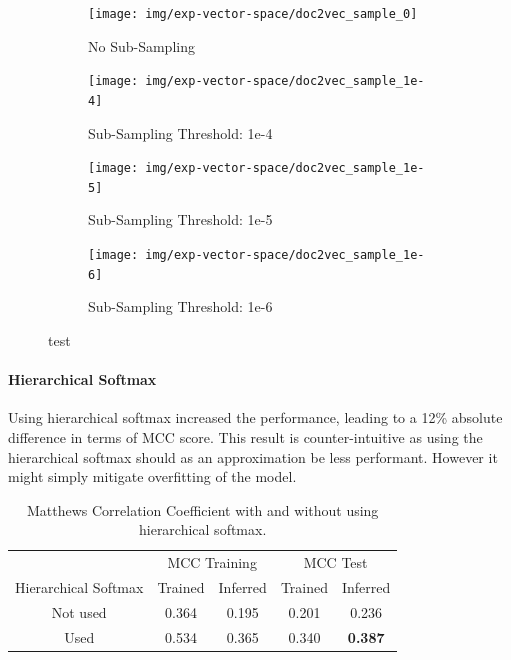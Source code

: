 \begin{figure}[h!]
    \centering
    \begin{subfigure}[b]{0.49\textwidth}
      \texttt{[image: img/exp-vector-space/doc2vec\_sample\_0]}
      \caption{No Sub-Sampling}
\label{fig:doc2vec_sample_0}
    \end{subfigure}
    \begin{subfigure}[b]{0.49\textwidth}
      \texttt{[image: img/exp-vector-space/doc2vec\_sample\_1e-4]}
    \caption{Sub-Sampling Threshold: 1e-4}
\label{fig:doc2vec_vector_size_1e-4}
    \end{subfigure}
    \begin{subfigure}[b]{0.49\textwidth}
      \texttt{[image: img/exp-vector-space/doc2vec\_sample\_1e-5]}
      \caption{Sub-Sampling Threshold: 1e-5}
\label{fig:doc2vec_vector_size_1e-5}
  \end{subfigure}
  \begin{subfigure}[b]{0.49\textwidth}
    \texttt{[image: img/exp-vector-space/doc2vec\_sample\_1e-6]}
    \caption{Sub-Sampling Threshold: 1e-6}
\label{fig:doc2vec_sample_1e-6}
  \end{subfigure}
\caption{test}
\label{fig:doc2vec_sample}
\end{figure}

\paragraph{Hierarchical Softmax}
Using hierarchical softmax increased the performance, leading to a 12\% absolute difference in terms of MCC score. This result is counter-intuitive as using the hierarchical softmax should as an approximation be less performant. However it might simply mitigate overfitting of the model.

\begin{table}[h]
  \begin{center}
    \begin{tabular}{ c | *2c | *2c }
      \toprule
       & \multicolumn{2}{c|}{MCC Training} & \multicolumn{2}{|c}{MCC Test}\\
      Hierarchical Softmax & Trained & Inferred & Trained & Inferred \\
      \midrule
      Not used & 0.364 & 0.195 & 0.201 & 0.236 \\
      Used     & 0.534 & 0.365 & 0.340 & \textbf{0.387} \\
    \bottomrule
  \end{tabular}
  \caption{Matthews Correlation Coefficient with and without using hierarchical softmax.}
\label{tab:Paragraph Vector Parameter Results Hierarchical Softmax}
\end{center}
\end{table}

